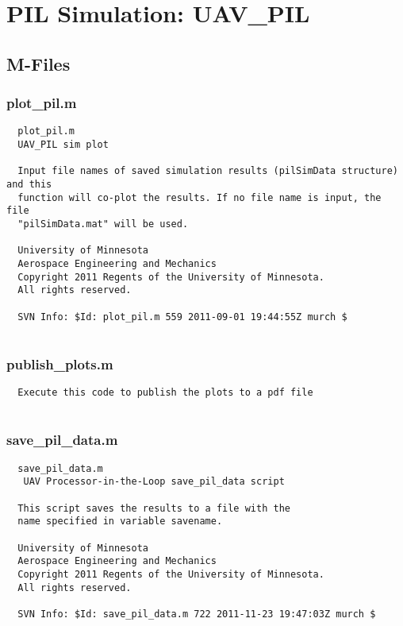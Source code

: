 \documentclass[12pt]{article}
\begin{document}
\section{PIL Simulation: UAV\_PIL}
\subsection{M-Files}
\subsubsection{plot\_pil.m}
\begin{verbatim}
  plot_pil.m
  UAV_PIL sim plot
 
  Input file names of saved simulation results (pilSimData structure) and this
  function will co-plot the results. If no file name is input, the file
  "pilSimData.mat" will be used.
 
  University of Minnesota
  Aerospace Engineering and Mechanics
  Copyright 2011 Regents of the University of Minnesota.
  All rights reserved.
 
  SVN Info: $Id: plot_pil.m 559 2011-09-01 19:44:55Z murch $


\end{verbatim}

\subsubsection{publish\_plots.m}
\begin{verbatim}
  Execute this code to publish the plots to a pdf file


\end{verbatim}

\subsubsection{save\_pil\_data.m}
\begin{verbatim}
  save_pil_data.m
   UAV Processor-in-the-Loop save_pil_data script
 
  This script saves the results to a file with the
  name specified in variable savename. 
 
  University of Minnesota 
  Aerospace Engineering and Mechanics 
  Copyright 2011 Regents of the University of Minnesota. 
  All rights reserved.
 
  SVN Info: $Id: save_pil_data.m 722 2011-11-23 19:47:03Z murch $


\end{verbatim}
\end{document}

